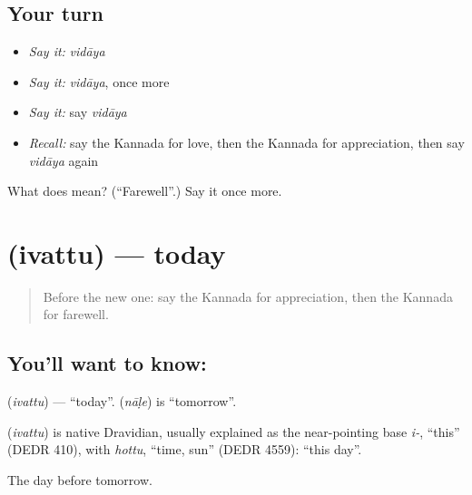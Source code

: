 \subsection*{Your turn}
\begin{itemize}
\raggedright
  \item \emph{Say it:} \emph{vidāya}
  \item \emph{Say it:} \emph{vidāya}, once more
  \item \emph{Say it:} say \emph{vidāya}
  \item \emph{Recall:} say the Kannada for love, then the Kannada for appreciation, then say \emph{vidāya} again
\end{itemize}

\begin{tcolorbox}[breakable,colback=teal!4,colframe=teal!35!black,title={Before you move on}]
What does  mean? (\textquotedblleft{}Farewell\textquotedblright{}.) Say it once more.
\end{tcolorbox}
\section[\texorpdfstring{\kn{ಇವತ್ತು} (ivattu)}{ಇವತ್ತು (ivattu)}]{ (ivattu) — today}

\label{lesson:KA-C106-today}



\begin{quote}
Before the new one: say the Kannada for appreciation, then the Kannada for farewell.
\end{quote}

\subsection*{You'll want to know: }
\textbf{} (\emph{ivattu}) — \textquotedblleft{}today\textquotedblright{}. \textbf{} (\emph{nāḷe}) is \textquotedblleft{}tomorrow\textquotedblright{}.

\begin{cousinweb}
\textbf{} (\emph{ivattu}) is native Dravidian, usually explained as the near-pointing base \emph{i-}, \textquotedblleft{}this\textquotedblright{} (DEDR 410), with \emph{hottu}, \textquotedblleft{}time, sun\textquotedblright{} (DEDR 4559): \textquotedblleft{}this day\textquotedblright{}.
\end{cousinweb}

\begin{grammarlens}[title={What you've built}]
The day before tomorrow.
\end{grammarlens}

